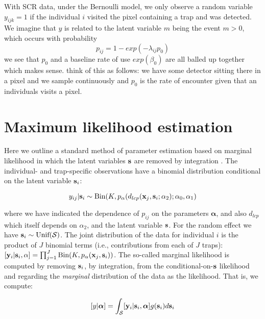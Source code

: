 With SCR data, under the Bernoulli model, 
 we only observe a random variable 
$y_{ijk} = 1$  if the individual $i$ visited the pixel
containing a trap and was detected. 
We imagine that $y$ is related to the latent variable $m$ being the
event $m>0$, which occurs with probability 
\[
 p_{ij} = 1-exp(- \lambda_{ij} p_{0} ) 
\]
we see that $p_{0}$ and a baseline rate of use  $exp(\beta_{0})$ are
all balled up together which makes sense. 
think of this as follows: we have some detector sitting there in a
pixel and we sample continuously and $p_{0}$ is the rate of encounter
given that an individuals visits a pixel. 









\section{Maximum likelihood estimation}
\label{sec.mle}

Here we outline a standard method of parameter estimation based on
marginal likelihood in which the latent 
variables ${\bf s}$ are removed by integration \citep{borchers_efford:2008}.
The individual- and trap-specific observations have a binomial
distribution conditional on the latent variable ${\bf s}_{i}$:

\begin{equation}
	y_{ij}| {\bf s}_{i} \sim \mbox{Bin}(K, p_{\alpha}(d_{lcp}({\bf x}_{j},{\bf s}_{i};\alpha_{2}); \alpha_{0}, \alpha_{1})
\label{rsf.mle.eq.cond-on-s}
\end{equation}

{\flushleft where} we have indicated the dependence of $p_{ij}$ on the parameters
${\bm \alpha}$, and also $d_{lcp}$ which
itself depends on $\alpha_{2}$, and the latent variable ${\bf s}$.
For the random effect we have ${\bf s}_{i} \sim  \mbox{Unif}({\cal
  S})$.
The joint distribution of the data for individual $i$ is the product
of $J$ binomial terms (i.e., contributions from each of $J$ traps):
$  [{\bf y}_{i} | {\bf s}_{i} , \alpha] =
  \prod_{j=1}^{J} \mbox{Bin}(K, p_{\alpha}({\bf x}_{j},{\bf s}_{i}) )$.
 The so-called marginal likelihood is computed by removing
${\bf s}_{i}$, by integration,  from the conditional-on-${\bf s}$
likelihood and regarding the {\it marginal} distribution of the data
as the likelihood. That
is, we compute:

\[
  [y|{\bm \alpha}] =
\int_{{\cal S}}  [ {\bf y}_{i} |{\bf s}_{i},{\bm \alpha}] g({\bf s}_{i}) d{\bf s}_{i}
\]

